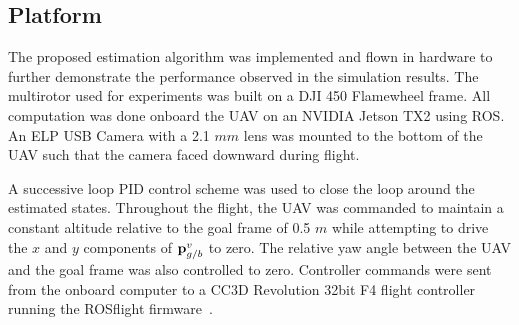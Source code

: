
\subsection{Platform}
The proposed estimation algorithm was implemented and flown in
hardware to further demonstrate the performance observed in the simulation
results. The multirotor used for experiments was built on a DJI 450 Flamewheel
frame. All computation was done onboard the UAV on an NVIDIA Jetson TX2 using
ROS. An ELP
USB Camera with a 2.1 $mm$ lens was mounted to the bottom of the UAV such that the
camera faced downward during flight.

A successive loop PID control scheme was used to close the loop around the
estimated states. Throughout the flight, the UAV was commanded to maintain a
constant altitude relative to the goal frame of 0.5 $m$ while attempting to
drive the $x$ and $y$ components of $\boldsymbol{\mathrm{p}}_{g/b}^v$ to zero. The relative yaw
angle between the UAV and the goal frame was also controlled to zero.
Controller commands were sent from
the onboard computer to a CC3D Revolution 32bit F4 flight controller running
the ROSflight firmware~\cite{jackson2016rosflight}.

